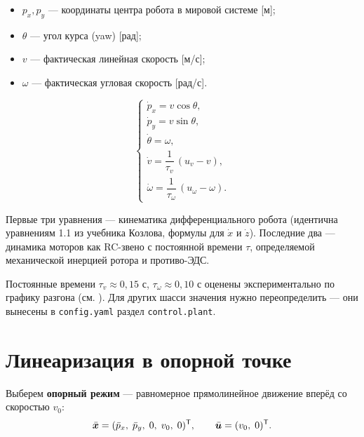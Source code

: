 \begin{itemize}
  \item $p_x, p_y$ --- координаты центра робота в мировой системе [м];
  \item $\theta$ --- угол курса (yaw) [рад];
  \item $v$ --- фактическая линейная скорость [м/с];
  \item $\omega$ --- фактическая угловая скорость [рад/с].
\end{itemize}

\begin{formulabox}[title={Нелинейная модель в форме $\dot{\vect{x}} = \vect{f}(\vect{x}, \vect{u})$}]
\begin{equation}
  \begin{cases}
    \dot{p}_x      = v\cos\theta,\\[2pt]
    \dot{p}_y      = v\sin\theta,\\[2pt]
    \dot{\theta}   = \omega,\\[2pt]
    \dot{v}        = \dfrac{1}{\tau_v}\,(u_v - v),\\[6pt]
    \dot{\omega}   = \dfrac{1}{\tau_\omega}\,(u_\omega - \omega).
  \end{cases}
  \label{eq:nonlinear_ode}
\end{equation}
\end{formulabox}

Первые три уравнения --- кинематика дифференциального робота
(идентична уравнениям 1.1 из учебника Козлова, формулы для $\dot{x}$ и $\dot{z}$).
Последние два --- динамика моторов как RC-звено с постоянной времени $\tau$,
определяемой механической инерцией ротора и противо-ЭДС.

\begin{notebox}
Постоянные времени $\tau_v \approx 0{,}15$ с, $\tau_\omega \approx 0{,}10$ с
оценены экспериментально по графику разгона (см.
). Для других шасси значения нужно
переопределить --- они вынесены в \texttt{config.yaml} раздел \texttt{control.plant}.
\end{notebox}

\section{Линеаризация в опорной точке}
\label{sec:linearization}

Выберем \textbf{опорный режим} --- равномерное прямолинейное движение
вперёд со скоростью $v_0$:
\begin{equation}
  \bar{\bm{x}} = (\bar{p}_x,\; \bar{p}_y,\; 0,\; v_0,\; 0)^{\mathsf{T}},
  \qquad
  \bar{\bm{u}} = (v_0,\; 0)^{\mathsf{T}}.
  \label{eq:operating_point}
\end{equation}

